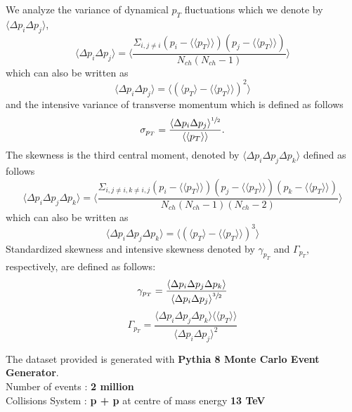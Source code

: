 \documentclass[letterpaper,aps,prc,superscriptaddress,nofootinbib,10pt,showpacs,floatfix]{revtex4-2}
\newcommand{\bfrac}[2]{\frac{\displaystyle #1}{\displaystyle #2}}
\begin{document}
We analyze the variance of dynamical $p_T$ fluctuations which we denote by $\langle \Delta p_i \Delta p_j\rangle $,
\begin{equation}
\label{eq:2}
\langle \Delta p_i \Delta p_j \rangle =\langle \bfrac{\Sigma_{i,j\neq i} {(p_i-\langle \langle p_T\rangle \rangle )(p_j-\langle \langle p_T\rangle \rangle )}}{N_{ch}(N_{ch}-1)}\rangle 
\end{equation}
which can also be written as
\begin{equation}
\label{eq:3}
\langle \Delta p_i \Delta p_j\rangle =\langle \left(\langle p_T\rangle -\langle \langle p_T\rangle \rangle \right)^2\rangle 
\end{equation}
and the intensive variance of transverse momentum which is defined as follows
\begin{equation}
\label{eq:4}
\sigma_{p_T}=\bfrac{\langle \Delta p_i \Delta p_j\rangle ^{\sfrac{1}{2}}}{\langle \langle p_T\rangle \rangle }.
\end{equation}
The skewness is the third central moment, denoted by $\langle \Delta p_i \Delta p_j \Delta p_k\rangle $ defined as follows
\begin{equation}
\label{eq:5}
\langle \Delta p_i \Delta p_j \Delta p_k\rangle =\langle \bfrac{\Sigma_{i,j\neq i, k\neq i,j} {(p_i-\langle \langle p_T\rangle \rangle )(p_j-\langle \langle p_T\rangle \rangle )(p_k-\langle \langle p_T\rangle \rangle )}}{N_{ch}(N_{ch}-1)(N_{ch}-2)}\rangle 
\end{equation}
which can also be written as
\begin{equation}
\label{eq:6}
\langle \Delta p_i \Delta p_j \Delta p_k \rangle =\langle \left(\langle p_T\rangle -\langle \langle p_T\rangle \rangle \right)^3\rangle 
\end{equation}
Standardized skewness and intensive skewness denoted by $\gamma_{p_T}$ and $\Gamma_{p_T}$, respectively, are defined as follows:
\begin{equation}
\label{eq:7}
\gamma_{p_T}=\bfrac{\langle \Delta p_i \Delta p_j \Delta p_k\rangle }{\langle \Delta p_i \Delta p_j\rangle ^{\sfrac{3}{2}}}
\end{equation}
\begin{equation}
\label{eq:8}
\Gamma_{p_T}= \bfrac{\langle \Delta p_i \Delta p_j \Delta p_k\rangle \langle \langle p_T\rangle \rangle }{\langle \Delta p_i \Delta p_j\rangle ^2}
\end{equation}


The dataset provided is generated with \textbf{Pythia 8 Monte Carlo Event Generator}. \\
Number of events :  \textbf{2 million} \\
Collisions System :  \textbf{p + p} at centre of mass energy \textbf{13 TeV}\\
\end{document}
